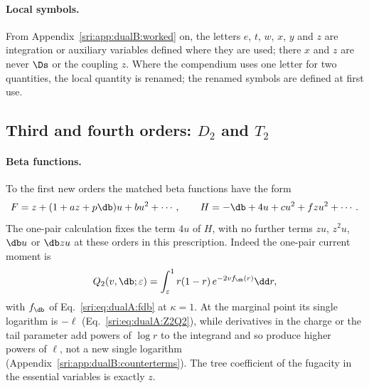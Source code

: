\paragraph{Local symbols.} From Appendix~\ref{sri:app:dualB:worked} on, the letters $e$, $t$, $w$, $x$, $y$ and $z$ are
integration or auxiliary variables defined where they are used; there $x$ and $z$ are never $\Ds$ or the coupling $z$.
Where the compendium uses one letter for two quantities, the local quantity is renamed; the renamed symbols are
defined at first use.

\subsection{Third and fourth orders: \texorpdfstring{$D_2$}{D2} and \texorpdfstring{$T_2$}{T2}}\label{sri:app:dualB:D2T2}
\paragraph{Beta functions.} To the first new orders the matched beta functions have the form
\begin{equation}
 F=z+(1+az+p\db)u+bu^2+\cdots,\qquad H=-\db+4u+cu^2+fzu^2+\cdots.
 \label{sri:eq:dualB:beta2}
\end{equation}
The one-pair calculation fixes the term $4u$ of $H$, with no further terms $zu$, $z^2u$, $\db u$ or $\db zu$ at these
orders in this prescription. Indeed the one-pair current moment is
\begin{equation}
 Q_2(v,\db;\varepsilon)=\int_\varepsilon^1r(1-r)\,e^{-2vf_{\db}(r)}\dd r,
\end{equation}
with $f_{\db}$ of Eq.~\eqref{sri:eq:dualA:fdb} at $\kappa=1$. At the marginal point its single logarithm is $-\ell$
(Eq.~\eqref{sri:eq:dualA:Z2Q2}), while derivatives in the charge or the tail parameter add powers of $\log r$ to the
integrand and so produce higher powers of $\ell$, not a new single logarithm
(Appendix~\ref{sri:app:dualB:counterterms}). The tree coefficient of the fugacity in the essential variables is exactly
$z$.

